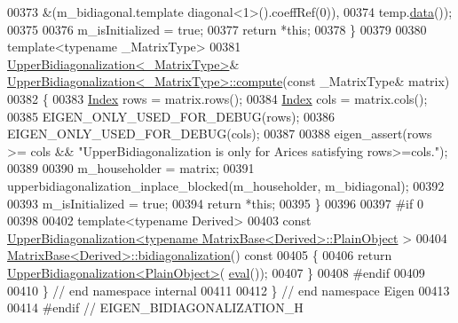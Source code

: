 \begin{DoxyCode}
00373                                            &(m\_bidiagonal.template diagonal<1>().coeffRef(0)),
00374                                            temp.\hyperlink{class_eigen_1_1_plain_object_base_ac25699535374b1854cf8494e44ad31b2}{data}());
00375 
00376   m\_isInitialized = \textcolor{keyword}{true};
00377   \textcolor{keywordflow}{return} *\textcolor{keyword}{this};
00378 \}
00379 
00380 \textcolor{keyword}{template}<\textcolor{keyword}{typename} \_MatrixType>
00381 \hyperlink{class_eigen_1_1internal_1_1_upper_bidiagonalization}{UpperBidiagonalization<\_MatrixType>}& 
      \hyperlink{class_eigen_1_1internal_1_1_upper_bidiagonalization}{UpperBidiagonalization<\_MatrixType>::compute}(\textcolor{keyword}{const} \_MatrixType&
       matrix)
00382 \{
00383   \hyperlink{class_eigen_1_1internal_1_1_upper_bidiagonalization_adcb14f3919a3dcc9977ba6b8105087fe}{Index} rows = matrix.rows();
00384   \hyperlink{class_eigen_1_1internal_1_1_upper_bidiagonalization_adcb14f3919a3dcc9977ba6b8105087fe}{Index} cols = matrix.cols();
00385   EIGEN\_ONLY\_USED\_FOR\_DEBUG(rows);
00386   EIGEN\_ONLY\_USED\_FOR\_DEBUG(cols);
00387 
00388   eigen\_assert(rows >= cols && \textcolor{stringliteral}{"UpperBidiagonalization is only for Arices satisfying rows>=cols."});
00389 
00390   m\_householder = matrix;
00391   upperbidiagonalization\_inplace\_blocked(m\_householder, m\_bidiagonal);
00392             
00393   m\_isInitialized = \textcolor{keyword}{true};
00394   \textcolor{keywordflow}{return} *\textcolor{keyword}{this};
00395 \}
00396 
00397 \textcolor{preprocessor}{#if 0}
00398 
00402 \textcolor{keyword}{template}<\textcolor{keyword}{typename} Derived>
00403 \textcolor{keyword}{const} \hyperlink{class_eigen_1_1internal_1_1_upper_bidiagonalization}{UpperBidiagonalization<typename MatrixBase<Derived>::PlainObject}
      >
00404 \hyperlink{group___core___module_class_eigen_1_1_matrix_base}{MatrixBase<Derived>::bidiagonalization}()\textcolor{keyword}{ const}
00405 \textcolor{keyword}{}\{
00406   \textcolor{keywordflow}{return} \hyperlink{class_eigen_1_1internal_1_1_upper_bidiagonalization}{UpperBidiagonalization<PlainObject>}(
      \hyperlink{struct_eigen_1_1internal_1_1eval}{eval}());
00407 \}
00408 \textcolor{preprocessor}{#endif}
00409 
00410 \} \textcolor{comment}{// end namespace internal}
00411 
00412 \} \textcolor{comment}{// end namespace Eigen}
00413 
00414 \textcolor{preprocessor}{#endif // EIGEN\_BIDIAGONALIZATION\_H}
\end{DoxyCode}
